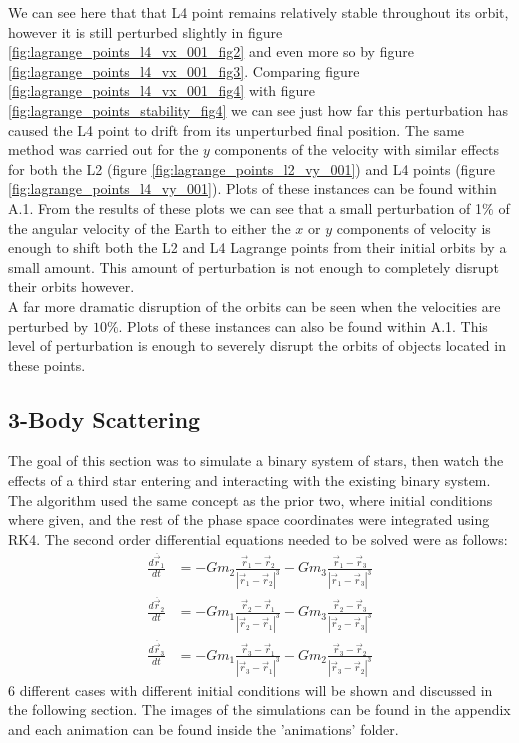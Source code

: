 \documentclass[10pt,letterpaper]{article}
\begin{document}
We can see here that that L4 point remains relatively stable throughout its orbit, however it is still perturbed slightly in figure \ref{fig:lagrange_points_l4_vx_001_fig2} and even more so by figure \ref{fig:lagrange_points_l4_vx_001_fig3}. Comparing figure \ref{fig:lagrange_points_l4_vx_001_fig4} with figure \ref{fig:lagrange_points_stability_fig4} we can see just how far this perturbation has caused the L4 point to drift from its unperturbed final position. The same method was carried out for the $y$ components of the velocity with similar effects for both the L2 (figure \ref{fig:lagrange_points_l2_vy_001}) and L4 points (figure \ref{fig:lagrange_points_l4_vy_001}). Plots of these instances can be found within A.1. From the results of these plots we can see that a small perturbation of 1$\%$ of the angular velocity of the Earth to either the $x$ or $y$ components of velocity is enough to shift both the L2 and L4 Lagrange points from their initial orbits by a small amount. This amount of perturbation is not enough to completely disrupt their orbits however.\\

A far more dramatic disruption of the orbits can be seen when the velocities are perturbed by $10\%$. Plots of these instances can also be found within A.1. This level of perturbation is enough to severely disrupt the orbits of objects located in these points.
   
\pagebreak
\subsection{3-Body Scattering}

The goal of this section was to simulate a binary system of stars, then watch the effects of a third star entering and interacting with the existing binary system. The algorithm used the same concept as the prior two, where initial conditions where given, and the rest of the phase space coordinates were integrated using RK4. The second order differential equations needed to be solved were as follows:
\begin{align}
\frac{d\ddot{\vec{r}_1}}{dt} &= -Gm_2 \frac{\vec{r}_1-\vec{r}_2}{\left| \vec{r}_1- \vec{r}_2\right|^3} - Gm_3 \frac{\vec{r}_1-\vec{r}_3}{\left| \vec{r}_1- \vec{r}_3\right|^3} \\
\frac{d\ddot{\vec{r}_2}}{dt} &= -Gm_1 \frac{\vec{r}_2-\vec{r}_1}{\left| \vec{r}_2- \vec{r}_1\right|^3} - Gm_3 \frac{\vec{r}_2-\vec{r}_3}{\left| \vec{r}_2- \vec{r}_3\right|^3} \\
\frac{d\ddot{\vec{r}_3}}{dt} &= -Gm_1 \frac{\vec{r}_3-\vec{r}_1}{\left| \vec{r}_3- \vec{r}_1\right|^3} - Gm_2 \frac{\vec{r}_3-\vec{r}_2}{\left| \vec{r}_3- \vec{r}_2\right|^3}
\end{align}
6 different cases with different initial conditions will be shown and discussed in the following section. The images of the simulations can be found in the appendix and each animation can be found inside the 'animations' folder.
\end{document}
